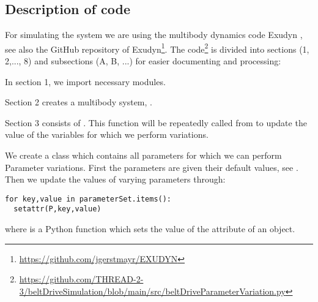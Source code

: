 \subsection{Description of code}
For simulating the system we are using the multibody dynamics code Exudyn \cite{Exudyn2023}, see also the GitHub repository of Exudyn\footnote{\url{https://github.com/jgerstmayr/EXUDYN}}.
%
The code\footnote{\url{https://github.com/THREAD-2-3/beltDriveSimulation/blob/main/src/beltDriveParameterVariation.py}} is divided into sections (1, 2,..., 8) and subsections (A, B, ...) for easier documenting and processing: %
\bi 
\item{In section 1, we import necessary modules.}
\item{Section 2 creates a multibody system, .}
\item{Section 3 consists of . This function will be repeatedly called from  to update the value of the variables for which we perform variations.} 
\bi
\item{
We create a class  which contains all parameters for which we can perform Parameter variations. First the parameters are given their default values, see . Then we update the values of varying parameters through:
\pythonstyle
\begin{tcolorbox}\begin{lstlisting}
for key,value in parameterSet.items():
  setattr(P,key,value)
\end{lstlisting}\end{tcolorbox}		
where  is a Python function which sets the value of the attribute of an object.}
%
